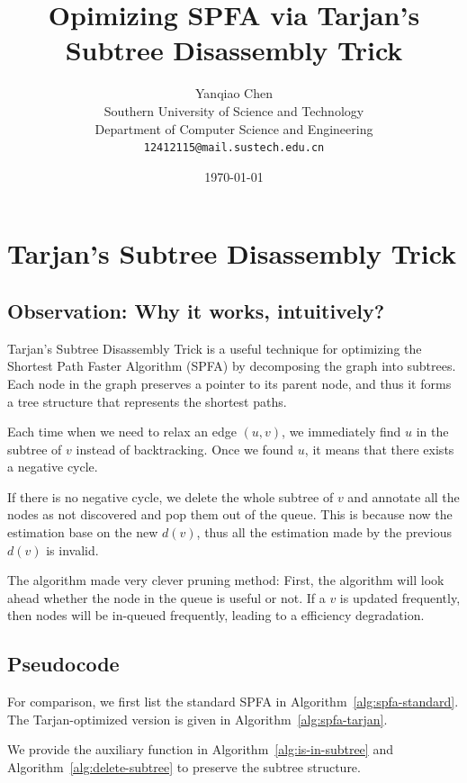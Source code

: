 \documentclass[a4paper]{article}
\title{\bf{Opimizing SPFA via Tarjan's Subtree Disassembly Trick}}
\author{Yanqiao Chen\\
        Southern University of Science and Technology\\
        Department of Computer Science and Engineering\\
        \texttt{12412115@mail.sustech.edu.cn}}
\date{\today}
\theoremstyle{definition}
\begin{document}
\maketitle

\section{Tarjan's Subtree Disassembly Trick}

\subsection{Observation: Why it works, intuitively?}

Tarjan's Subtree Disassembly Trick\cite{shokry2019shortestpathalgorithmstheory} is a useful technique for optimizing the Shortest Path Faster Algorithm (SPFA) by decomposing the graph into subtrees. Each node in the graph preserves a pointer to its parent node, and thus it forms a tree structure that represents the shortest paths.

Each time when we need to relax an edge $(u, v)$, we immediately find $u$ in the subtree of $v$ instead of backtracking. Once we found $u$, it means that there exists a negative cycle. 

If there is no negative cycle, we delete the whole subtree of $v$ and annotate all the nodes as not discovered and pop them out of the queue. This is because now the estimation base on the new $d(v)$, thus all the estimation made by the previous $d(v)$ is invalid.

The algorithm made very clever pruning method: First, the algorithm will look ahead whether the node in the queue is useful or not. If a $v$ is updated frequently, then nodes will be in-queued frequently, leading to a efficiency degradation.

\subsection{Pseudocode}

For comparison, we first list the standard SPFA in Algorithm~\ref{alg:spfa-standard}. The Tarjan-optimized version is given in Algorithm~\ref{alg:spfa-tarjan}.

We provide the auxiliary function in Algorithm~\ref{alg:is-in-subtree} and Algorithm~\ref{alg:delete-subtree} to preserve the subtree structure.
\end{document}
